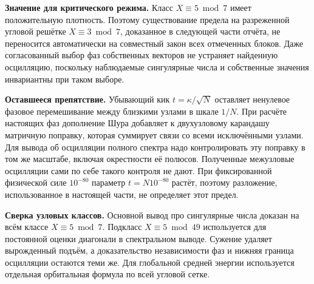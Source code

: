 \documentclass[11pt,a4paper]{article}
\newcommand{\subt}[1]{\par\medskip\noindent\textbf{#1.}\quad}
\begin{document}
\subt{Значение для критического режима}
Класс \(X\equiv5\bmod7\) имеет положительную плотность. Поэтому существование предела на разреженной угловой решётке \(X\equiv3\bmod7\), доказанное в следующей части отчёта, не переносится автоматически на совместный закон всех отмеченных блоков. Даже согласованный выбор фаз собственных векторов не устраняет найденную осцилляцию, поскольку наблюдаемые сингулярные числа и собственные значения инвариантны при таком выборе.

\subt{Оставшееся препятствие}
Убывающий кик \(t=\kappa/\sqrt N\) оставляет ненулевое фазовое перемешивание между близкими узлами в шкале \(1/N\). При расчёте настоящих фаз дополнение Шура добавляет к двухузловому карандашу матричную поправку, которая суммирует связи со всеми исключёнными узлами. Для вывода об осцилляции полного спектра надо контролировать эту поправку в том же масштабе, включая окрестности её полюсов. Полученные межузловые осцилляции сами по себе такого контроля не дают. При фиксированной физической силе \(10^{-80}\) параметр \(t=N10^{-80}\) растёт, поэтому разложение, использованное в настоящей части, не определяет этот предел.

\subt{Сверка узловых классов}
Основной вывод про сингулярные числа доказан на всём классе \(X\equiv5\bmod7\). Подкласс \(X\equiv5\bmod49\) используется для постоянной оценки диагонали в спектральном выводе. Сужение удаляет вырожденный подъём, а доказательство независимости фаз и нижняя граница осцилляции остаются теми же. Для глобальной средней энергии используется отдельная орбитальная формула по всей угловой сетке.
\end{document}

